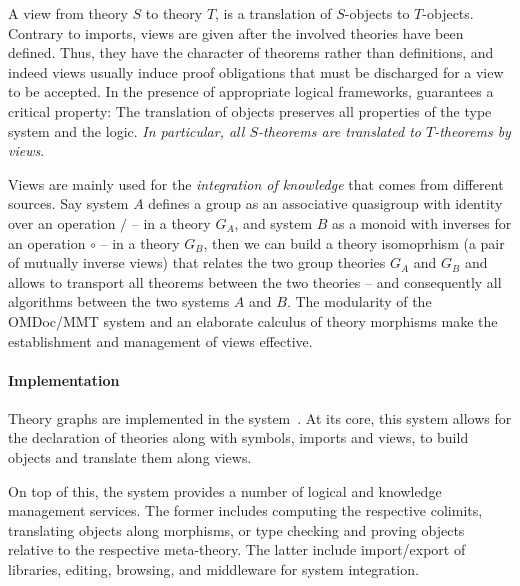 A view from theory $S$ to theory $T$, is a translation of $S$-objects to $T$-objects.
Contrary to imports, views are given after the involved theories have been defined.  Thus,
they have the character of theorems rather than definitions, and indeed views usually
induce proof obligations that must be discharged for a view to be accepted.  In the
presence of appropriate logical frameworks, \MMT guarantees a critical property: The
translation of objects preserves all properties of the type system and the logic.
\emph{In particular, all $S$-theorems are translated to $T$-theorems by views}.

Views are mainly used for the \emph{integration of knowledge} that comes from different
sources. Say system $A$ defines a group as an associative quasigroup with identity over an
operation $/$ -- in a theory $G_A$, and system $B$ as a monoid with inverses for an
operation $\circ$ -- in a theory $G_B$, then we can build a theory isomoprhism (a pair of
mutually inverse views) that relates the two group theories $G_A$ and $G_B$ and allows to
transport all theorems between the two theories -- and consequently all algorithms between
the two systems $A$ and $B$. The modularity of the OMDoc/MMT system and an elaborate
calculus of theory morphisms make the establishment and management of views effective.

\paragraph{Implementation}
Theory graphs are implemented in the \MMT system~\cite{Rabe:MAGMS13,uniformal:on}.
At its core, this system allows for the declaration of theories along with symbols, imports and views, to build objects and translate them along views.

On top of this, the \MMT system provides a number of logical and knowledge management services.
The former includes computing the respective colimits, translating objects along morphisms, or type checking and proving objects relative to the respective meta-theory.
The latter include import/export of libraries, editing, browsing, and middleware for system integration.


